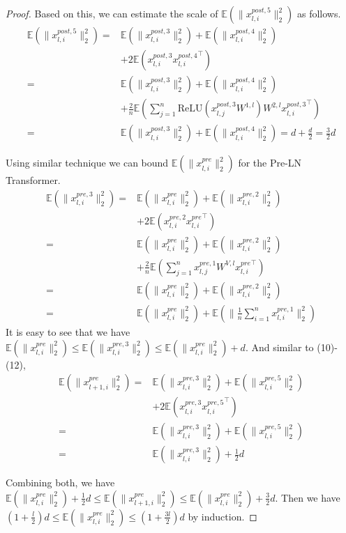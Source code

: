 \documentclass{article}
\begin{document}
\begin{proof}
Based on this, we can estimate the scale of $\mathbb{E}(\|x_{l,i}^{post,5}\|_2^2)$ as follows.
\begin{align}
\mathbb{E}(\|x_{l,i}^{post,5}\|_2^2)=&\mathbb{E}(\|x_{l,i}^{post,3}\|_2^2)+\mathbb{E}(\|x_{l,i}^{post,4}\|_2^2)\nonumber\\
&+2\mathbb{E}(x_{l,i}^{post,3}{x_{l,i}^{post,4}}^{\top})\\
=&\mathbb{E}(\|x_{l,i}^{post,3}\|_2^2)+\mathbb{E}(\|x_{l,i}^{post,4}\|_2^2)\nonumber\\
&+\frac{2}{n}\mathbb{E}(\sum_{j=1}^{n}\text{ReLU}(x^{post,3}_{l,j}W^{1,l}) W^{2, l}{x_{l,i}^{post,3}}^{\top})\\
=&\mathbb{E}(\|x_{l,i}^{post,3}\|_2^2)+\mathbb{E}(\|x_{l,i}^{post,4}\|_2^2)=d+\frac{d}{2}= \frac{3}{2}d
\end{align}

Using similar technique we can bound $\mathbb{E}(\|x_{l,i}^{pre}\|_2^2)$ for the Pre-LN Transformer. 
\begin{align}
\mathbb{E}(\|x_{l,i}^{pre,3}\|_2^2)=&\mathbb{E}(\|x_{l,i}^{pre}\|_2^2)+\mathbb{E}(\|x_{l,i}^{pre,2}\|_2^2)\nonumber\\
&+2\mathbb{E}(x_{l,i}^{pre,2}{x_{l,i}^{pre}}^{\top})\\
=&\mathbb{E}(\|x_{l,i}^{pre}\|_2^2)+\mathbb{E}(\|x_{l,i}^{pre,2}\|_2^2)\nonumber\\
&+\frac{2}{n}\mathbb{E}(\sum_{j=1}^{n}x_{l, j}^{pre,1} W^{V, l}{x_{l,i}^{pre}}^{\top})\\
=&\mathbb{E}(\|x_{l,i}^{pre}\|_2^2)+\mathbb{E}(\|x_{l,i}^{pre,2}\|_2^2)\\
=&\mathbb{E}(\|x_{l,i}^{pre}\|_2^2)+\mathbb{E}(\|\frac{1}{n}\sum_{i=1}^n x_{l,i}^{pre,1}\|_2^2)
\end{align}
It is easy to see that we have $\mathbb{E}(\|x_{l,i}^{pre}\|_2^2) \leq \mathbb{E}(\|x_{l,i}^{pre,3}\|_2^2) \leq \mathbb{E}(\|x_{l,i}^{pre}\|_2^2)+d$. And similar to (10)-(12),
\begin{align}
\mathbb{E}(\|x_{l+1,i}^{pre}\|_2^2)=&\mathbb{E}(\|x_{l,i}^{pre,3}\|_2^2)+\mathbb{E}(\|x_{l,i}^{pre,5}\|_2^2)\nonumber\\
&+2\mathbb{E}(x_{l,i}^{pre,3}{x_{l,i}^{pre,5}}^{\top})\\
=&\mathbb{E}(\|x_{l,i}^{pre,3}\|_2^2)+\mathbb{E}(\|x_{l,i}^{pre,5}\|_2^2)\\
=&\mathbb{E}(\|x_{l,i}^{pre,3}\|_2^2)+\frac{1}{2}d
\end{align}

Combining both, we have $\mathbb{E}(\|x_{l,i}^{pre}\|_2^2) +\frac{1}{2}d\leq\mathbb{E}(\|x_{l+1,i}^{pre}\|_2^2)\leq \mathbb{E}(\|x_{l,i}^{pre}\|_2^2)+\frac{3}{2}d$. Then we have  $(1+\frac{l}{2})d\leq\mathbb{E}(\|x_{l,i}^{pre}\|_2^2)\leq(1+\frac{3l}{2})d$ by induction.
 
\end{proof}
\end{document}
